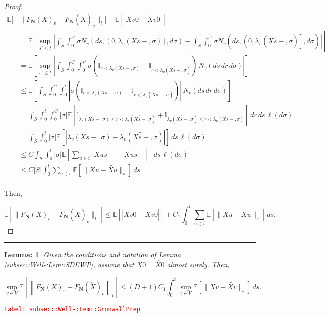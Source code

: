 \documentclass[12pt]{article}
\newcommand{\mb}{\mathbb}
\newcommand{\ov}{\overline}
\newcommand{\tr}{\textcolor{red}}
\newcommand{\labe}[1]{\tr{\texttt{Label: #1}}}
\newcommand{\lin}{\rule{\linewidth}{0.4 pt}}
\newcommand{\ex}[1]{\mb{E}\left[#1\right]}			%
\renewcommand{\v}{v}							%
\newcommand{\vv}{u}								%
\renewcommand{\S}{S}							%
\newcommand{\s}{\sigma}							%
\renewcommand{\t}{t}							%
\renewcommand{\tt}{s}							%
\newcommand{\ttt}{s'}							%
\newcommand{\X}{X}								%
\newcommand{\cl}{\ov}							%
\newcommand{\degr}{D}								%
\newcommand{\poiss}[1]{N_{#1}}						%
\newcommand{\poisses}{\mathbf{N}}				%
\renewcommand{\r}{r}								%
\newcommand{\rate}[1]{\lambda_{#1}}					%
\newcommand{\const}[1]{C_{#1}}						%
\newcommand{\Sm}{\ell}								%
\newcommand{\alt}{\widetilde}						%
\newtheorem{lem}[thms]{Lemma: }
\begin{document}
\begin{proof}
\begin{align*}
\mb{E}\bigg[&\|F_\poisses(\X{}{})_\v - F_\poisses(\alt{\X{}{}})_\v\|_\t\bigg] - \ex{|\X{\v}{0} - \alt{\X{\v}{0}}|}\\
&= \ex{\sup_{\ttt \leq \t}\left|\int_\S\int_0^{\ttt} \s\poiss{\v}\left(d\tt,\left(0,\rate{\v}(\X{}{\tt-},\s)\right],d\s\right) -  \int_\S\int_0^{\ttt} \s\poiss{\v}\left(d\tt,\left(0,\rate{\v}(\alt{\X{}{\tt-}},\s)\right],d\s\right)\right|}\\
&=\ex{\sup_{\ttt\leq \t} \left|\int_\S \int_0^{\const{}} \int_0^{\ttt} \s\left(\mb{I}_{\r < \rate{\v}(\X{}{\tt-},\s)} - \mb{I}_{\r < \rate{\v}(\alt{\X{}{\tt-}},\s)}\right)\,\poiss{\v}(d\tt\,d\r\,d\s)\right|}\\
&\leq \ex{\int_\S\int_0^{\const{}}\int_0^\t \left|\s\left(\mb{I}_{\r < \rate{\v}(\X{}{\tt-},\s)} - \mb{I}_{\r < \rate{\v}(\alt{\X{}{\tt-}},\s)}\right)\right|\,\poiss{\v}(d\tt\,d\r\,d\s)}\\
&=\int_\S\int_0^\t\int_0^{\const{}} |\s|\ex{\mb{I}_{\rate{\v}(\X{}{\tt-},\s) \leq \r < \rate{\v}(\alt{\X{}{\tt-}},\s)} + \mb{I}_{\rate{\v}(\alt{\X{}{\tt-}},\s) \leq \r < \rate{\v}(\X{}{\tt-},\s)}}\,d\r\,d\tt\,\Sm(d\s)\\
&= \int_\S\int_0^\t|\s|\ex{\left|\rate{\v}(\X{}{\tt-},\s) - \rate{\v}(\alt{\X{}{\tt-}},\s)\right|}\,d\tt\,\Sm(d\s)\\
&\leq \const{}\int_\S\int_0^\t |\s| \ex{\sum_{\vv \in \cl{\v}}|\X{\vv}{\tt-} - \alt{\X{\vv}{\tt-}}|}\,d\tt\,\Sm(d\s)\\
&\leq \const{}|\S|\int_0^\t \sum_{\vv \in \cl{\v}}\ex{\|\X{\vv}{} - \alt{\X{\vv}{}}\|_\tt}\,d\tt\\
\end{align*}

Then,

\[\ex{\|F_\poisses(\X{}{})_\v - F_\poisses(\alt{\X{}{}})_\v\|_\t} \leq \ex{|\X{\v}{0} - \alt{\X{\v}{0}}|} +  \const{1}\int_0^\t \sum_{\vv\in \cl{\v}} \ex{\|\X{\vv}{} - \alt{\X{\vv}{}}\|_\tt}\,d\tt.\]

\end{proof}

\lin

\begin{lem}
Given the conditions and notation of Lemma \ref{subsec::Well-:Lem::SDEWP}, assume that \(\X{}{0} = \alt{\X{}{0}}\) almost surely. Then,

\[\sup_{\v \in  V} \ex{\left\|F_\poisses(\X{}{})_\v - F_\poisses(\alt{\X{}{}})_\v\right\|_\t} \leq (\degr+1)\const{1}\int_0^\t \sup_{\v \in  V} \ex{\|\X{\v}{} - \alt{\X{\v}{}}\|_\tt}\,d\tt.\]
\label{subsec::Well-:Lem::GronwallPrep}
\end{lem}
\labe{subsec::Well-:Lem::GronwallPrep}
\end{document}
